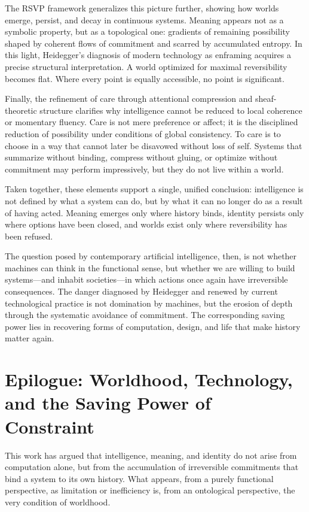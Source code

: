 \documentclass[11pt]{article}
\begin{document}
The RSVP framework generalizes this picture further, showing how worlds emerge, persist, and decay in continuous systems. Meaning appears not as a symbolic property, but as a topological one: gradients of remaining possibility shaped by coherent flows of commitment and scarred by accumulated entropy. In this light, Heidegger’s diagnosis of modern technology as enframing acquires a precise structural interpretation. A world optimized for maximal reversibility becomes flat. Where every point is equally accessible, no point is significant.

Finally, the refinement of care through attentional compression and sheaf-theoretic structure clarifies why intelligence cannot be reduced to local coherence or momentary fluency. Care is not mere preference or affect; it is the disciplined reduction of possibility under conditions of global consistency. To care is to choose in a way that cannot later be disavowed without loss of self. Systems that summarize without binding, compress without gluing, or optimize without commitment may perform impressively, but they do not live within a world.

Taken together, these elements support a single, unified conclusion: intelligence is not defined by what a system can do, but by what it can no longer do as a result of having acted. Meaning emerges only where history binds, identity persists only where options have been closed, and worlds exist only where reversibility has been refused.

The question posed by contemporary artificial intelligence, then, is not whether machines can think in the functional sense, but whether we are willing to build systems—and inhabit societies—in which actions once again have irreversible consequences. The danger diagnosed by Heidegger and renewed by current technological practice is not domination by machines, but the erosion of depth through the systematic avoidance of commitment. The corresponding saving power lies in recovering forms of computation, design, and life that make history matter again.

\section*{Epilogue: Worldhood, Technology, and the Saving Power of Constraint}

This work has argued that intelligence, meaning, and identity do not arise from computation alone, but from the accumulation of irreversible commitments that bind a system to its own history. What appears, from a purely functional perspective, as limitation or inefficiency is, from an ontological perspective, the very condition of worldhood.
\end{document}
